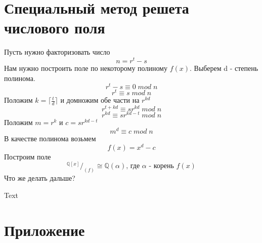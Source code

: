 \documentclass[oneside,final,14pt]{extreport}
\theoremstyle{plain}
\begin{document}
\chapter{Специальный метод решета числового поля}
Пусть нужно факторизовать число $$n=r^t-s$$
Нам нужно построить поле по некоторому полиному $f(x)$. Выберем d - степень полинома.
$$r^t-s\equiv0 \; mod \; n$$
$$r^t\equiv s \; mod \; n$$
Положим $k=\lceil\frac{t}{d}\rceil$ и домножим обе части на $r^{kd}$
$$r^{t+kd}\equiv sr^{kd} \; mod \; n$$
$$r^{kd}\equiv sr^{kd-t} \; mod \; n$$
Положим $m=r^{k}$ и $c=sr^{kd-t}$
$$m^{d}\equiv c \; mod \; n$$
В качестве полинома возьмем
$$f(x)=x^d-c$$
Построим поле
$$^{\mathbb{Q}[x]}/_{(f)} \cong \mathbb{Q}(\alpha)\text{, где $\alpha$ - корень $f(x)$}$$
Что же делать дальше?







\begin{thebibliography}{0}




 Text







\end{thebibliography}
\appendix
\chapter{Приложение}\label{AppendixA}
\end{document}
